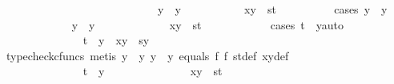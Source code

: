 \begin{isabellebody}
\ \ \ \ \ \ \ \ \ \isamarkupfalse%
\isanewline
\ \ \ \ \ \ \ \isamarkupfalse%
\isanewline
\ \ \ \ \ \ \ \ \ \isamarkupfalse%
\ {\isachardoublequoteopen}y\ {\isasymnoteq}\ y{}{\isachardoublequoteclose}\isanewline
\ \ \ \ \ \ \ \ \ \isamarkupfalse%
\ {\isachardoublequoteopen}{\isasymlangle}x{\isacharcomma}{\kern0pt}y{\isasymrangle}\ {\isacharequal}{\kern0pt}\ {\isasymlangle}s{\isacharcomma}{\kern0pt}t{\isasymrangle}{\isachardoublequoteclose}\isanewline
\ \ \ \ \ \ \ \ \ \isamarkupfalse%
{\isacharparenleft}{\kern0pt}cases\ {\isachardoublequoteopen}y\ {\isacharequal}{\kern0pt}\ y{}{\isachardoublequoteclose}{\isacharparenright}{\kern0pt}\isanewline
\ \ \ \ \ \ \ \ \ \ \ \isamarkupfalse%
\ {\isachardoublequoteopen}y\ {\isacharequal}{\kern0pt}\ y{}{\isachardoublequoteclose}\isanewline
\ \ \ \ \ \ \ \ \ \ \ \isamarkupfalse%
\ {\isachardoublequoteopen}{\isasymlangle}x{\isacharcomma}{\kern0pt}y{\isasymrangle}\ {\isacharequal}{\kern0pt}\ {\isasymlangle}s{\isacharcomma}{\kern0pt}t{\isasymrangle}{\isachardoublequoteclose}\isanewline
\ \ \ \ \ \ \ \ \ \ \ \isamarkupfalse%
{\isacharparenleft}{\kern0pt}cases\ {\isachardoublequoteopen}t\ {\isacharequal}{\kern0pt}\ y{}{\isachardoublequoteclose}{\isacharcomma}{\kern0pt}auto{\isacharparenright}{\kern0pt}\isanewline
\ \ \ \ \ \ \ \ \ \ \ \ \ \isamarkupfalse%
\ {\isachardoublequoteopen}t\ {\isacharequal}{\kern0pt}\ y{}\ {\isasymLongrightarrow}\ {\isasymlangle}x{\isacharcomma}{\kern0pt}y{\isasymrangle}\ {\isacharequal}{\kern0pt}\ {\isasymlangle}s{\isacharcomma}{\kern0pt}y{}{\isasymrangle}{\isachardoublequoteclose}\isanewline
\ \ \ \ \ \ \ \ \ \ \ \ \ \ \ \isamarkupfalse%
\ {\isacharparenleft}{\kern0pt}typecheck{\isacharunderscore}{\kern0pt}cfuncs{\isacharcomma}{\kern0pt}\ metis\ {\isacartoucheopen}y\ {\isacharequal}{\kern0pt}\ y{}{\isacartoucheclose}\ {\isacartoucheopen}y\ {\isasymnoteq}\ y{}{\isacartoucheclose}\ equals\ f{}\ f{}\ st{\isacharunderscore}{\kern0pt}def\ xy{\isacharunderscore}{\kern0pt}def{\isacharparenright}{\kern0pt}\isanewline
\ \ \ \ \ \ \ \ \ \ \ \isamarkupfalse%
\isanewline
\ \ \ \ \ \ \ \ \ \ \ \ \ \isamarkupfalse%
\ {\isachardoublequoteopen}t\ {\isasymnoteq}\ y{}{\isachardoublequoteclose}\isanewline
\ \ \ \ \ \ \ \ \ \ \ \ \ \isamarkupfalse%
\ {\isachardoublequoteopen}{\isasymlangle}x{\isacharcomma}{\kern0pt}y{\isasymrangle}\ {\isacharequal}{\kern0pt}\ {\isasymlangle}s{\isacharcomma}{\kern0pt}t{\isasymrangle}{\isachardoublequoteclose}\isanewline

\end{isabellebody}
